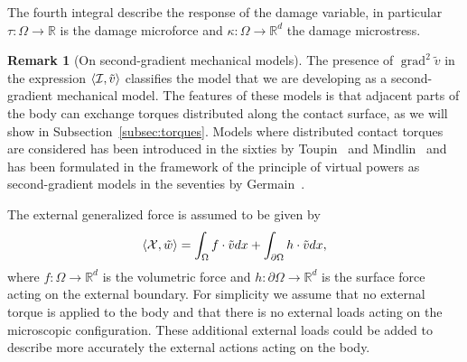 \documentclass[a4paper,10pt,twoside]{amsbook}
\numberwithin{section}{chapter}
\numberwithin{equation}{chapter}
\theoremstyle{definition}
\newtheorem{rmk}[prop]{Remark}
\DeclareMathOperator{\grad}{grad}
\DeclarePairedDelimiter{\dual}{\langle}{\rangle}
\begin{document}
The fourth integral describe the response of the damage variable, in particular $\tau\colon\Omega\to\mathbb{R}$ is the damage microforce and $\kappa\colon\Omega\to\mathbb{R}^d$ the damage microstress.
\begin{rmk}[On second-gradient mechanical models]
The presence of $\grad^2\tilde v$ in the expression $\dual{\mathcal{I},\tilde v}$ classifies the model that we are developing as a second-gradient mechanical model. The features of these models is that adjacent parts of the body can exchange torques distributed along the contact surface, as we will show in Subsection~\ref{subsec:torques}. Models where distributed contact torques are considered has been introduced in the sixties by Toupin~\cite{toupin1962elastic} and Mindlin~\cite{mindlin1964microstructure} and has been formulated in the framework of the principle of virtual powers as second-gradient models in the seventies by Germain~\cite{germain}.
\end{rmk}
The external generalized force is assumed to be given by
\[
\dual{\mathcal{X},\tilde w}=\int_\Omega f\cdot\tilde vdx+\int_{\partial\Omega}h\cdot\tilde vdx,
\]
where $f\colon\Omega\to\mathbb{R}^d$ is the volumetric force and $h\colon\partial\Omega\to\mathbb{R}^d$ is the surface force acting on the external boundary. For simplicity we assume that no external torque is applied to the body and that there is no external loads acting on the microscopic configuration. These additional external loads could be added to describe more accurately the external actions acting on the body.
\end{document}
